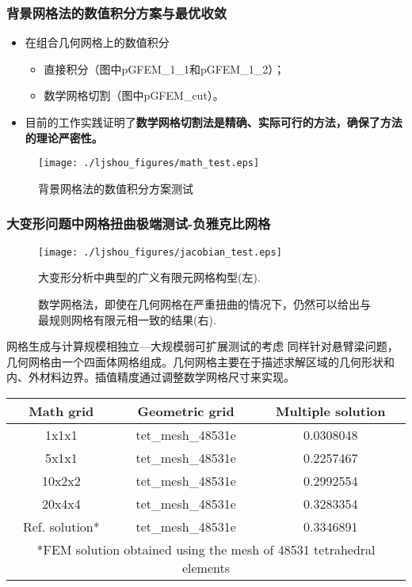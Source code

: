 \documentclass[mathserif]{beamer}
\begin{document}
\begin{CJK}{UTF8}{gkai}
\begin{frame}
	\frametitle{背景网格法的数值积分方案与最优收敛}
	\begin{itemize}
		\item 在组合几何网格上的数值积分
		\begin{itemize}
			\item 直接积分（图中pGFEM\_1\_1和pGFEM\_1\_2）；
			\item 数学网格切割（图中pGFEM\_cut）。
		\end{itemize}
		\item 目前的工作实践证明了\bf{数学网格切割法}是精确、实际可行的方法，确保了方法的理论严密性。
	\end{itemize}
	
	\begin{figure}
		\centering
		\texttt{[image: ./ljshou\_figures/math\_test.eps]}
		\caption{背景网格法的数值积分方案测试}
	\end{figure}
\end{frame}

\begin{frame}
	\frametitle{大变形问题中网格扭曲极端测试-负雅克比网格}
	\begin{figure}
		\centering
		\texttt{[image: ./ljshou\_figures/jacobian\_test.eps]}
		\caption{大变形分析中典型的广义有限元网格构型(左).}
		\caption{数学网格法，即使在几何网格在严重扭曲的情况下，仍然可以给出与最规则网格有限元相一致的结果(右). }
	\end{figure}
\end{frame}


\begin{frame}{网格生成与计算规模相独立—大规模弱可扩展测试的考虑}
同样针对悬臂梁问题，几何网格由一个四面体网格组成。几何网格主要在于描述求解区域的几何形状和内、外材料边界。插值精度通过调整数学网格尺寸来实现。

\begin{table}[h] 
\small %
    \begin{tabular}{ccc} 
    \toprule
    Math grid & Geometric grid & Multiple solution\\
    \midrule
    1x1x1	& tet\_mesh\_48531e	& 0.0308048\\
    5x1x1	& tet\_mesh\_48531e	& 0.2257467\\
    10x2x2	& tet\_mesh\_48531e	& 0.2992554\\
    20x4x4	& tet\_mesh\_48531e	& 0.3283354\\
    Ref. solution*	& tet\_mesh\_48531e	& 0.3346891\\
    \midrule
    \multicolumn{3}{c}{*FEM solution obtained using the mesh of 48531 tetrahedral elements} \\
    \bottomrule
    \end{tabular}
\end{table}


\end{frame}
\end{CJK}
\end{document}

